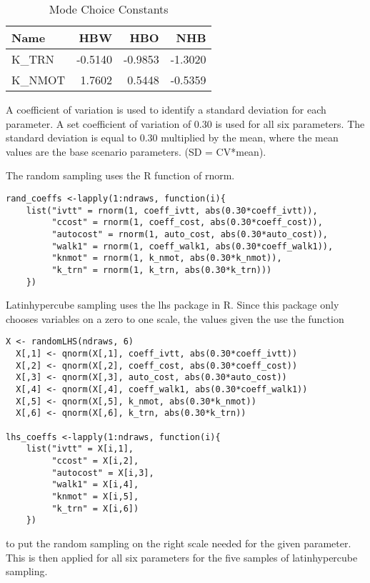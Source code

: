 \documentclass[3p, authoryear, review]{elsarticle} %
\begin{document}
\begin{table}

\caption{\label{tab:MCconst}Mode Choice Constants}
\centering
\begin{tabular}[t]{l|r|r|r}
\hline
Name & HBW & HBO & NHB\\
\hline
K\_TRN & -0.5140 & -0.9853 & -1.3020\\
\hline
K\_NMOT & 1.7602 & 0.5448 & -0.5359\\
\hline
\end{tabular}
\end{table}

A coefficient of variation is used to identify a standard deviation for each parameter. A set coefficient of variation of 0.30 is used for all six parameters. The standard deviation is equal to 0.30 multiplied by the mean, where the mean values are the base scenario parameters. (SD = CV*mean).

The random sampling uses the R function of rnorm.

\begin{verbatim}
rand_coeffs <-lapply(1:ndraws, function(i){
    list("ivtt" = rnorm(1, coeff_ivtt, abs(0.30*coeff_ivtt)), 
         "ccost" = rnorm(1, coeff_cost, abs(0.30*coeff_cost)), 
         "autocost" = rnorm(1, auto_cost, abs(0.30*auto_cost)), 
         "walk1" = rnorm(1, coeff_walk1, abs(0.30*coeff_walk1)), 
         "knmot" = rnorm(1, k_nmot, abs(0.30*k_nmot)), 
         "k_trn" = rnorm(1, k_trn, abs(0.30*k_trn)))
    })
\end{verbatim}

Latinhypercube sampling uses the lhs package in R. Since this package only chooses variables on a zero to one scale, the values given the use the function

\begin{verbatim}
X <- randomLHS(ndraws, 6) 
  X[,1] <- qnorm(X[,1], coeff_ivtt, abs(0.30*coeff_ivtt)) 
  X[,2] <- qnorm(X[,2], coeff_cost, abs(0.30*coeff_cost)) 
  X[,3] <- qnorm(X[,3], auto_cost, abs(0.30*auto_cost)) 
  X[,4] <- qnorm(X[,4], coeff_walk1, abs(0.30*coeff_walk1))
  X[,5] <- qnorm(X[,5], k_nmot, abs(0.30*k_nmot)) 
  X[,6] <- qnorm(X[,6], k_trn, abs(0.30*k_trn))
  
lhs_coeffs <-lapply(1:ndraws, function(i){
    list("ivtt" = X[i,1], 
         "ccost" = X[i,2], 
         "autocost" = X[i,3], 
         "walk1" = X[i,4], 
         "knmot" = X[i,5], 
         "k_trn" = X[i,6])
    })
\end{verbatim}

to put the random sampling on the right scale needed for the given parameter. This is then applied for all six parameters for the five samples of latinhypercube sampling.
\end{document}
